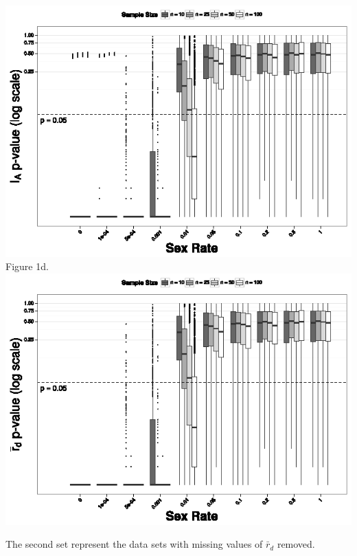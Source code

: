 \documentclass[letterpaper, 10pt]{article}
\begin{document}
\begin{center}
\includegraphics{figures/Ia_pval.eps}\\Figure 1d.\\
\includegraphics{figures/rbarD_pval.eps}\\
\end{center}

The second set represent the data sets with missing values of $\bar{r}_d$ removed.
\end{document}
